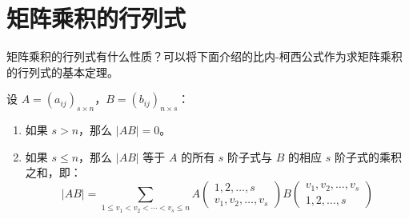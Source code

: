 
\section{矩阵乘积的行列式}

矩阵乘积的行列式有什么性质？可以将下面介绍的比内-柯西公式作为求矩阵乘积的行列式的基本定理。

\begin{theorem}[比内-柯西公式]
	设 $A = (a_{ij})_{s \times n}$，$B = (b_{ij})_{n \times s}$：

	\begin{enumerate}
		\item 如果 $s > n$，那么 $|AB| = 0$。
		\item 如果 $s \le n$，那么 $|AB|$ 等于 $A$ 的所有 $s$ 阶子式与 $B$ 的相应 $s$ 阶子式的乘积之和，即：
		$$
		|AB| = \sum\limits_{1 \le v_1 < v_2 < \cdots < v_s \le n} A \begin{pmatrix} 1, 2, \ldots, s \\ v_1, v_2, \ldots, v_s \end{pmatrix} B \begin{pmatrix} v_1, v_2, \ldots, v_s \\ 1, 2, \ldots, s \end{pmatrix}
		$$
	\end{enumerate}
\end{theorem}

